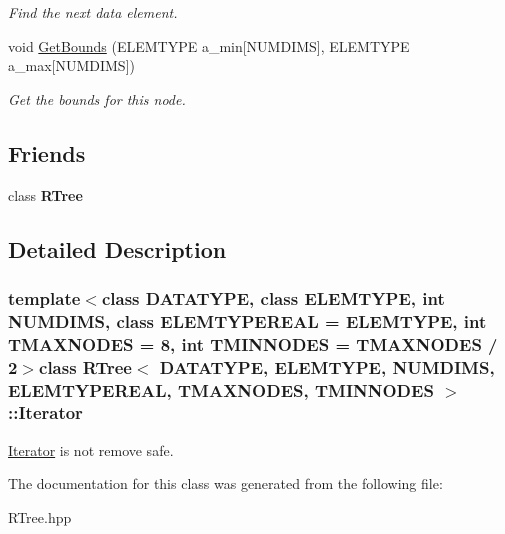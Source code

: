 \begin{DoxyCompactItemize}
\begin{DoxyCompactList}\small\item\em \-Find the next data element. \end{DoxyCompactList}\item 
\hypertarget{class_r_tree_1_1_iterator_a65121f5016c2b1bf4696797748092709}{void \hyperlink{class_r_tree_1_1_iterator_a65121f5016c2b1bf4696797748092709}{\-Get\-Bounds} (\-E\-L\-E\-M\-T\-Y\-P\-E a\-\_\-min\mbox{[}\-N\-U\-M\-D\-I\-M\-S\mbox{]}, \-E\-L\-E\-M\-T\-Y\-P\-E a\-\_\-max\mbox{[}\-N\-U\-M\-D\-I\-M\-S\mbox{]})}\label{class_r_tree_1_1_iterator_a65121f5016c2b1bf4696797748092709}

\begin{DoxyCompactList}\small\item\em \-Get the bounds for this node. \end{DoxyCompactList}\end{DoxyCompactItemize}
\subsection*{\-Friends}
\begin{DoxyCompactItemize}
\item 
\hypertarget{class_r_tree_1_1_iterator_af5d7fbb9e949ef77e8d3e32670fa9dd6}{class {\bfseries \-R\-Tree}}\label{class_r_tree_1_1_iterator_af5d7fbb9e949ef77e8d3e32670fa9dd6}

\end{DoxyCompactItemize}


\subsection{\-Detailed \-Description}
\subsubsection*{template$<$class \-D\-A\-T\-A\-T\-Y\-P\-E, class \-E\-L\-E\-M\-T\-Y\-P\-E, int \-N\-U\-M\-D\-I\-M\-S, class \-E\-L\-E\-M\-T\-Y\-P\-E\-R\-E\-A\-L = \-E\-L\-E\-M\-T\-Y\-P\-E, int \-T\-M\-A\-X\-N\-O\-D\-E\-S = 8, int \-T\-M\-I\-N\-N\-O\-D\-E\-S = \-T\-M\-A\-X\-N\-O\-D\-E\-S / 2$>$class R\-Tree$<$ D\-A\-T\-A\-T\-Y\-P\-E, E\-L\-E\-M\-T\-Y\-P\-E, N\-U\-M\-D\-I\-M\-S, E\-L\-E\-M\-T\-Y\-P\-E\-R\-E\-A\-L, T\-M\-A\-X\-N\-O\-D\-E\-S, T\-M\-I\-N\-N\-O\-D\-E\-S $>$\-::\-Iterator}

\hyperlink{class_r_tree_1_1_iterator}{\-Iterator} is not remove safe. 

\-The documentation for this class was generated from the following file\-:\begin{DoxyCompactItemize}
\item 
\-R\-Tree.\-hpp\end{DoxyCompactItemize}
